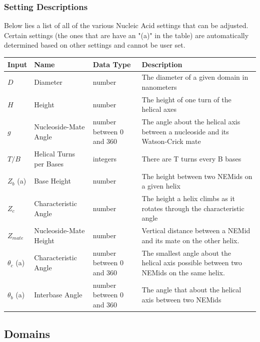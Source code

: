 \documentclass[titlepage]{article}
\begin{document}
	\subsubsection{Setting Descriptions}
	Below lies a list of all of the various Nucleic Acid settings that can be adjusted. Certain settings (the ones that are have an "(a)" in the table) are automatically determined based on other settings and cannot be user set. \linebreak
	
	\begin{center}
	\begin{tabular}{|p{.5in}|p{1in}|p{.7in}|p{1.5in}|}
		\label{tab:setting-descriptions}
		Input & Name & Data Type & Description \\
		\hline
		$D$ & Diameter & number & The diameter of a given domain in nanometers \\ \hline
		$H$ & Height & number & The height of one turn of the helical axes \\ \hline
		$g$ & Nucleoside-Mate Angle & number between 0 and 360 & The angle about the helical axis between a nucleoside and its Watson-Crick mate \\ \hline
		$T/B$ & Helical Turns per Bases & integers & There are T turns every B bases \\ \hline
		$Z_b$ (a) & Base Height & number & The height between two NEMids on a given helix \\ \hline
		$Z_c$ & Characteristic Angle & number & The height a helix climbs as it rotates through the characteristic angle \\ \hline
		$Z_{mate}$ & Nucleoside-Mate Height & number & Vertical distance between a NEMid and its mate on the other helix. \\ \hline
		$\theta_{c}$ (a) & Characteristic Angle & number between 0 and 360 & The smallest angle about the helical axis possible between two NEMids on the same helix. \\ \hline
		$\theta_{b}$ (a) & Interbase Angle & number between 0 and 360 & The angle that about the helical axis between two NEMids \\
	\end{tabular}
	\end{center}
	
	\subsection{Domains}
	
\end{document}
